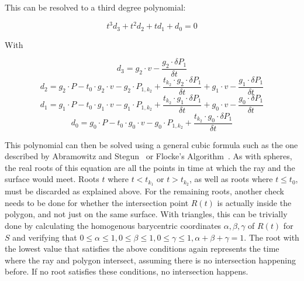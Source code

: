 This can be resolved to a third degree polynomial:

\begin{equation}\label{SurfacePolyStart}
    t^3d_3 + t^2d_2 + td_1 + d_0 = 0
\end{equation}

With

\begin{equation}
    d_3 = g_2 \cdot v
    - \frac{g_2 \cdot \delta P_1}{\delta t}
\end{equation}
\begin{equation}
    d_2 = g_2 \cdot P
    - t_0 \cdot g_2 \cdot v
    - g_2 \cdot P_{1, k_2}
    + \frac{t_{k_2} \cdot g_2 \cdot \delta P_1}{\delta t}
    + g_1 \cdot v
    - \frac{g_1 \cdot \delta P_1}{\delta t}
\end{equation}
\begin{equation}
    d_1 = g_1 \cdot P
    - t_0 \cdot g_1 \cdot v
    - g_1 \cdot P_{1, k_2}
    + \frac{t_{k_2} \cdot g_1 \cdot \delta P_1}{\delta t}
    + g_0 \cdot v
    - \frac{g_0 \cdot \delta P_1}{\delta t}
\end{equation}
\begin{equation}\label{SurfacePolyEnd}
    d_0 = g_0 \cdot P
    - t_0 \cdot g_0 \cdot v
    - g_0 \cdot P_{1, k_2}
    + \frac{t_{k_2} \cdot g_0 \cdot \delta P_1}{\delta t}
\end{equation}

This polynomial can then be solved using a general cubic formula such as the one described by Abramowitz and Stegun~\cite{AS48}
or Flocke's Algorithm~\cite{Fl15}.
\newline
As with spheres, the real roots of this equation are all the points in time at which the ray and the surface would meet.
Roots \(t\) where \(t < t_{k_1}\) or \(t > t_{k_2}\), as well as roots where \(t \le t_0\),
must be discarded as explained above.
\newline
For the remaining roots, another check needs to be done
for whether the intersection point \(R(t)\) is actually inside the polygon, and not just on the same surface.
With triangles, this can be trivially done by calculating the homogenous barycentric coordinates \(\alpha, \beta, \gamma\) of \(R(t)\) for \(S\)
and verifying that \(0 \le \alpha \le 1, 0 \le \beta \le 1, 0 \le \gamma \le 1, \alpha + \beta + \gamma = 1\).
\newline
The root with the lowest value that satisfies the above conditions again represents the time where the ray and polygon intersect,
assuming there is no intersection happening before. If no root satisfies these conditions, no intersection happens.

